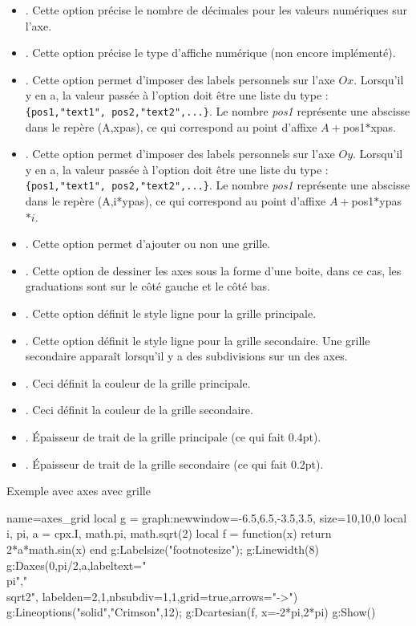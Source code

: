 \begin{itemize}
\begin{itemize}
            \item {}. Cette option précise le nombre de décimales pour les valeurs numériques sur l'axe.
            \item {}. Cette option précise le type d'affiche numérique (non encore implémenté).
            \item {}. Cette option permet d'imposer des labels personnels sur l'axe $Ox$. Lorsqu'il y en a, la valeur passée à l'option doit être une liste du type : \verb|{pos1,"text1", pos2,"text2",...}|. Le nombre \emph{pos1} représente une abscisse dans le repère (A,xpas), ce qui correspond au point d'affixe $A+$pos1$*$xpas.
            \item {}. Cette option permet d'imposer des labels personnels sur l'axe $Oy$. Lorsqu'il y en a, la valeur passée à l'option doit être une liste du type : \verb|{pos1,"text1", pos2,"text2",...}|. Le nombre \emph{pos1} représente une abscisse dans le repère (A,i*ypas), ce qui correspond au point d'affixe $A+$pos1$*$ypas$*i$.
            \item {}. Cette option permet d'ajouter ou non une grille.
            \item {}. Cette option de dessiner les axes sous la forme d'une boite, dans ce cas, les graduations sont sur le côté gauche et le côté bas.
            \item {}. Cette option définit le style ligne pour la grille principale.
            \item {}. Cette option définit le style ligne pour la grille secondaire. Une grille secondaire apparaît lorsqu'il y a des subdivisions sur un des axes.
            \item  {}. Ceci définit la couleur de la grille principale.
            \item {}. Ceci définit la couleur de la grille secondaire.
            \item {}. Épaisseur de trait de la grille principale (ce qui fait 0.4pt).
            \item {}. Épaisseur de trait de la grille secondaire (ce qui fait 0.2pt).
        \end{itemize}
\end{itemize}

\begin{demo}{Exemple avec axes avec grille}
\begin{luadraw}{name=axes_grid}
local g = graph:new{window={-6.5,6.5,-3.5,3.5}, size={10,10,0}}
local i, pi, a = cpx.I, math.pi, math.sqrt(2)
local f = function(x) return 2*a*math.sin(x) end
g:Labelsize("footnotesize"); g:Linewidth(8)
g:Daxes({0,pi/2,a},{labeltext={"\\pi","\\sqrt{2}"}, labelden={2,1},nbsubdiv={1,1},grid=true,arrows="->"})
g:Lineoptions("solid","Crimson",12); g:Dcartesian(f, {x={-2*pi,2*pi}})
g:Show()
\end{luadraw}
\end{demo}

